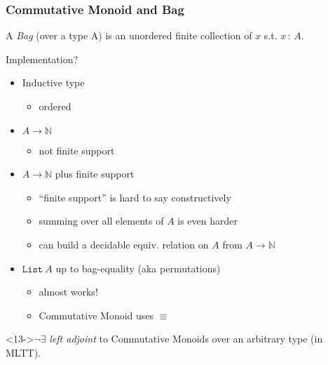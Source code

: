 \documentclass[serif,mathserif,professionalfont,10pt]{beamer}
\begin{document}
\begin{frame}
\frametitle{Commutative Monoid and Bag}
\begin{definition}
A \emph{Bag} (over a type A) is an unordered finite collection
of $x$ s.t. $x\,:\,A$.
\end{definition}
\pause
Implementation?
\begin{itemize}
\item<2-> Inductive type
\begin{itemize}
\item<3-> ordered
\end{itemize}
\item<4-> $A \rightarrow \mathbb{N}$
\begin{itemize}
\item<5-> not finite support
\end{itemize}
\item<6-> $A \rightarrow \mathbb{N}$ plus finite support
\begin{itemize}
\item<7-> ``finite support'' is hard to say constructively
\item<8-> summing over all elements of $A$ is even harder
\item<9-> can build a decidable equiv. relation on $A$ from $A \rightarrow \mathbb{N}$
\end{itemize}
\item<10-> $\texttt{List}\ A$ up to bag-equality (aka permutations)
\begin{itemize}
\item<11-> almost works!
\item<12-> Commutative Monoid uses $\equiv$
\end{itemize}
\end{itemize}
\begin{theorem}<13->$\neg\exists$ \emph{left adjoint} to Commutative
  Monoids over an arbitrary type (in MLTT).
\end{theorem}
\end{frame}
\end{document}
